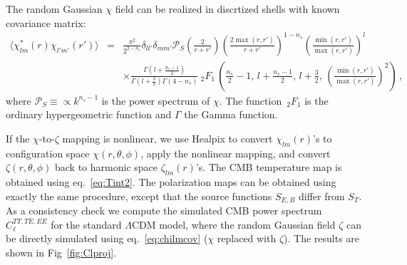 The random Gaussian $\chi$ field can be realized in discrtized shells with known covariance matrix:
\begin{eqnarray}
  \langle \chi^*_{lm}(r) \chi_{l'm'}(r')\rangle &=& \frac{\pi^2}{2^{2-n_s}}  \delta_{ll'}\delta_{mm'} \mathcal{P}_S\left(\frac{2}{r+r'}\right) \left(\frac{2\max(r,r')}{r+r'}\right)^{1-n_s} \left(\frac{\min(r, r')}{\max(r,r')}\right)^l \label{eq:chilmcov} \\
 &&  \times \frac{\Gamma\left(l+\frac{n_s-1}{2}\right)}{\Gamma\left(l+\frac{3}{2}\right)\Gamma\left(4-n_s\right)} {\ _2F_1\,}\left( \frac{n_s}{2}-1,\, l+\frac{n_s-1}{2},\, l+ \frac{3}{2},\, \left(\frac{\min(r, r')}{\max(r,r')}\right)^2\right)     \nonumber \, , 
\end{eqnarray}
where $\mathcal{P}_S\equiv \propto k^{n_s-1} $ is the power spectrum of $\chi$. The function $\,_2F_1$ is the ordinary hypergeometric function and $\Gamma$ the Gamma function.

If the $\chi$-to-$\zeta$ mapping is nonlinear, we use Healpix to convert $\chi_{lm}(r)$'s to configuration space $\chi(r, \theta, \phi)$, apply the nonlinear mapping, and convert $\zeta(r, \theta, \phi)$ back to harmonic space $\zeta_{lm}(r)$'s. The CMB temperature map is obtained using eq.~\eqref{eq:Tint2}. The polarization maps can be obtained using exactly the same procedure, except that the source functions $S_{E,B}$ differ from $S_T$. As a consistency check we compute the simulated CMB power spectrum $C_\ell^{TT,TE,EE}$ for the standard $\Lambda$CDM model, where the random Gaussian field $\zeta$ can be directly simulated using eq.~\eqref{eq:chilmcov} ($\chi$ replaced with $\zeta$). The results are shown in Fig~\ref{fig:Clproj}.

